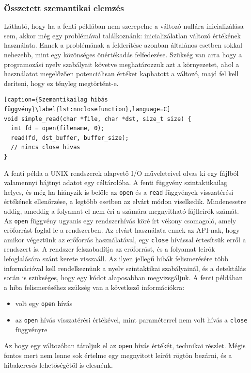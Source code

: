 \documentclass[a4paper,12pt]{report}
\begin{document}
\subsubsection{Összetett szemantikai elemzés}
Látható, hogy ha a fenti példában nem szerepelne a változó nullára inicializálása sem, akkor még egy problémával találkoznánk: inicializálatlan változó értékének használata. Ennek a problémának a felderítése azonban általános esetben sokkal nehezebb, mint egy közönséges önértékadás felfedezése. Szükség van arra hogy a programozási nyelv szabályait követve meghatározzuk azt a környezetet, ahol a használatot megelőzően potenciálisan értéket kaphatott a változó, majd fel kell deríteni, hogy ez tényleg megtörtént-e.
\begin{lstlisting}[caption={Szemantikailag hibás függvény}\label{lst:noclosefunction},language=C]
void simple_read(char *file, char *dst, size_t size) {
  int fd = open(filename, 0);
  read(fd, dst_buffer, buffer_size);
  // nincs close hivas
}
\end{lstlisting}
A fenti példa a UNIX rendszerek alapvető I/O műveleteivel olvas ki egy fájlból valamennyi bájtnyi adatot egy céltárolóba. A fenti függvény szintaktikailag helyes, és még ha hiányzik is belőle az \texttt{open} és a \texttt{read} függvények visszatérési értékének ellenőrzése, a legtöbb esetben az elvárt módon viselkedik. Mindenesetre addig, ameddig a folyamat el nem éri a számára megnyitható fájlleírók számát. Az \texttt{open} függvény ugyanis egy rendszerhívás köré írt vékony csomagoló, amely erőforrást foglal le a rendszerben. Az elvárt használata ennek az API-nak, hogy amikor végeztünk az erőforrás használatával, egy \texttt{close} hívással értesítsük erről a rendszert is. A rendszer felszabadítja az erőforrást, és a folyamat leírók lefoglalására szánt kerete visszaáll.
Az ilyen jellegű hibák felismerésére több információval kell rendelkeznünk a nyelv szintaktikai szabályainál, és a detektálás során is szükséges, hogy egy kódot alaposabban megvizsgáljuk. A fenti példában a hiba felismeréséhez szükség van a következő információkra:
\begin{itemize}
\item volt egy \texttt{open} hívás
\item az \texttt{open} hívás visszatérési értékével, mint paraméterrel nem volt hívás a \texttt{close} függvényre
\end{itemize}
Az hogy egy változóban tároljuk el az \texttt{open} hívás értékét, technikai részlet. Mégis fontos mert nem lenne sok értelme egy megnyitott leírót rögtön bezárni, és a hibakeresés lehetőségétől is elesnénk.
\end{document}
